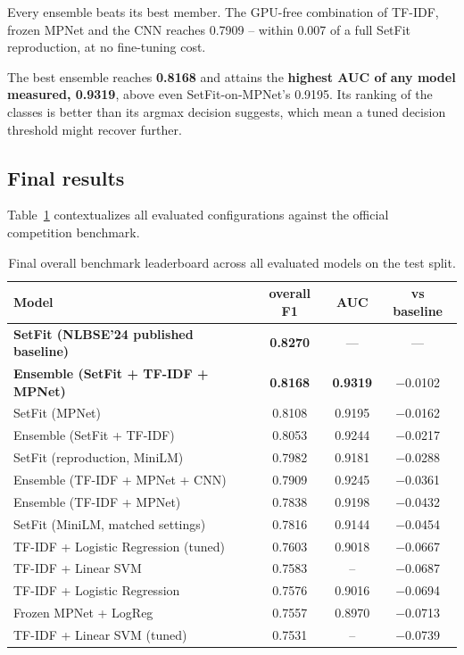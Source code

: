 Every ensemble beats its best member. The GPU-free combination of TF-IDF, frozen MPNet and the CNN reaches 0.7909 -- within 0.007 of a full SetFit reproduction, at no fine-tuning cost.

The best ensemble reaches \textbf{0.8168} and attains the \textbf{highest AUC of any model measured, 0.9319}, above even SetFit-on-MPNet's 0.9195. Its ranking of the classes is better than its argmax decision suggests, which mean a tuned decision threshold might recover further.

\subsection{Final results}
Table~\ref{tab:final_leaderboard} contextualizes all evaluated configurations against the official competition benchmark.
\begin{table}[H]
\centering
\caption{Final overall benchmark leaderboard across all evaluated models on the test split.}
\label{tab:final_leaderboard}
\vspace{0.5em}
\begin{tabular}{l c c c}
\hline
Model & overall F1 & AUC & vs baseline \\
\hline
\textbf{SetFit (NLBSE'24 published baseline)} & \textbf{0.8270} & --- & --- \\
\textbf{Ensemble (SetFit + TF-IDF + MPNet)} & \textbf{0.8168} & \textbf{0.9319} & $-$0.0102 \\
SetFit (MPNet) & 0.8108 & 0.9195 & $-$0.0162 \\
Ensemble (SetFit + TF-IDF) & 0.8053 & 0.9244 & $-$0.0217 \\
SetFit (reproduction, MiniLM) & 0.7982 & 0.9181 & $-$0.0288 \\
Ensemble (TF-IDF + MPNet + CNN) & 0.7909 & 0.9245 & $-$0.0361 \\
Ensemble (TF-IDF + MPNet) & 0.7838 & 0.9198 & $-$0.0432 \\
SetFit (MiniLM, matched settings) & 0.7816 & 0.9144 & $-$0.0454 \\
TF-IDF + Logistic Regression (tuned) & 0.7603 & 0.9018 & $-$0.0667 \\
TF-IDF + Linear SVM & 0.7583 & -- & $-$0.0687 \\
TF-IDF + Logistic Regression & 0.7576 & 0.9016 & $-$0.0694 \\
Frozen MPNet + LogReg & 0.7557 & 0.8970 & $-$0.0713 \\
TF-IDF + Linear SVM (tuned) & 0.7531 & -- & $-$0.0739 \\

\end{tabular}
\end{table}
